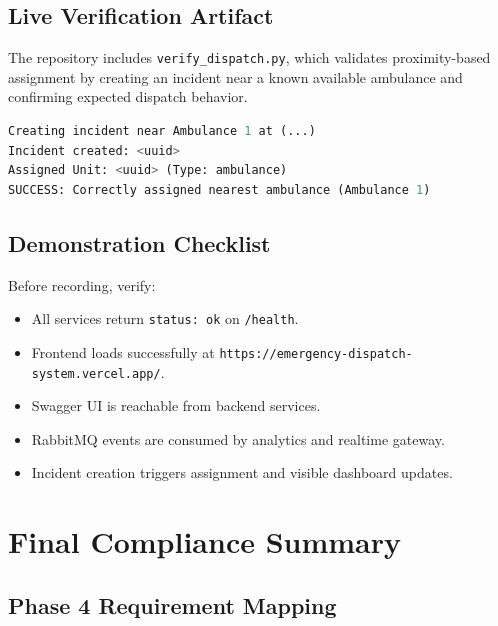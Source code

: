 \documentclass[12pt,a4paper]{report}
\begin{document}
\section{Live Verification Artifact}

The repository includes \texttt{verify_dispatch.py}, which validates proximity-based assignment by creating an incident near a known available ambulance and confirming expected dispatch behavior.

\begin{lstlisting}[language=python, caption=Expected Verification Output Excerpt]
Creating incident near Ambulance 1 at (...)
Incident created: <uuid>
Assigned Unit: <uuid> (Type: ambulance)
SUCCESS: Correctly assigned nearest ambulance (Ambulance 1)
\end{lstlisting}

\section{Demonstration Checklist}

Before recording, verify:

\begin{itemize}
	\item All services return \texttt{status: ok} on \texttt{/health}.
	\item Frontend loads successfully at \texttt{https://emergency-dispatch-system.vercel.app/}.
	\item Swagger UI is reachable from backend services.
	\item RabbitMQ events are consumed by analytics and realtime gateway.
	\item Incident creation triggers assignment and visible dashboard updates.
\end{itemize}

\newpage

\chapter{Final Compliance Summary}

\section{Phase 4 Requirement Mapping}
\end{document}
